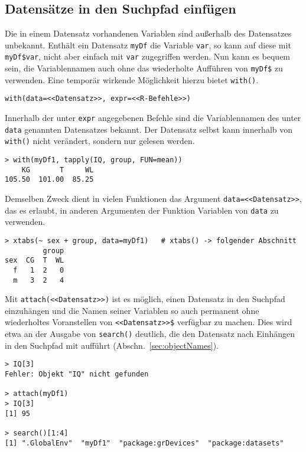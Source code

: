 \subsection{Datensätze in den Suchpfad einfügen}

Die in einem Datensatz vorhandenen Variablen sind außerhalb des Datensatzes unbekannt. Enthält ein Datensatz \lstinline!myDf! die Variable \lstinline!var!, so kann auf diese mit \lstinline!myDf$var!, nicht aber einfach mit \lstinline!var! zugegriffen werden. Nun kann es bequem sein, die Variablennamen auch ohne das wiederholte Aufführen von \lstinline!myDf$! zu verwenden. Eine temporär wirkende Möglichkeit hierzu bietet \lstinline!with()!.
\begin{lstlisting}
with(data=<<Datensatz>>, expr=<<R-Befehle>>)
\end{lstlisting}

Innerhalb der unter \lstinline!expr! angegebenen Befehle sind die Variablennamen des unter \lstinline!data! genannten Datensatzes bekannt. Der Datensatz selbst kann innerhalb von \lstinline!with()! nicht verändert, sondern nur gelesen werden.
\begin{lstlisting}
> with(myDf1, tapply(IQ, group, FUN=mean))
    KG       T     WL
105.50  101.00  85.25
\end{lstlisting}

Demselben Zweck dient in vielen Funktionen das Argument
\lstinline!data=<<Datensatz>>!, das es erlaubt, in anderen Argumenten der Funktion Variablen von \lstinline!data! zu verwenden.
\begin{lstlisting}
> xtabs(~ sex + group, data=myDf1)   # xtabs() -> folgender Abschnitt
         group
sex  CG  T  WL
  f   1  2   0
  m   3  2   4
\end{lstlisting}

Mit \lstinline!attach(<<Datensatz>>)! ist es möglich, einen Datensatz in den Suchpfad einzuhängen und die Namen seiner Variablen so auch permanent ohne wiederholtes Voranstellen von \lstinline!<<Datensatz>>$! verfügbar zu machen. Dies wird etwa an der Ausgabe von \lstinline!search()! deutlich, die den Datensatz nach Einhängen in den Suchpfad mit aufführt (Abschn.\ \ref{sec:objectNames}).
\begin{lstlisting}
> IQ[3]
Fehler: Objekt "IQ" nicht gefunden

> attach(myDf1)
> IQ[3]
[1] 95

> search()[1:4]
[1] ".GlobalEnv"  "myDf1"  "package:grDevices"  "package:datasets"
\end{lstlisting}

